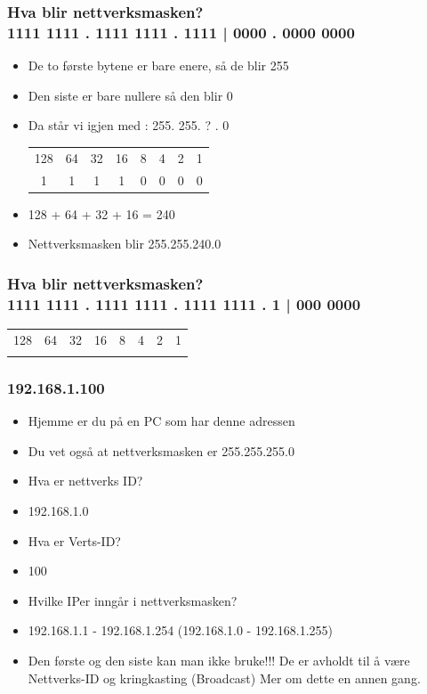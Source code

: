 \documentclass[aspectratio=169,xcolor=dvipsnames]{beamer}
\begin{document}
\begin{frame}
	\frametitle{Hva blir nettverksmasken?\\1111 1111 . 1111 1111 . 1111 | 0000 . 0000 0000 }

			\begin{itemize}
				\item De to første bytene er bare enere, så de blir 255
				\item Den siste er bare nullere så den blir 0
				\item Da står vi igjen med : 255. 255. ? . 0\\
\begin{center}
\begin{tabular}{ c c c c c c c c}
128 & 64 	& 32 	& 16 	& 8  	& 4	& 2	&  1\\
1 & 1 	& 1 	& 1 	& 0  	& 0	& 0	&  0\\
\end{tabular}
\end{center}
				\item 128 + 64 + 32 + 16 = 240
				\item Nettverksmasken blir 255.255.240.0
				

			\end{itemize}
\end{frame}
\begin{frame}
	\frametitle{Hva blir nettverksmasken?\\ 1111 1111 . 1111 1111 . 1111 1111 . 1 | 000 0000 }


\begin{center}
\begin{tabular}{ c c c c c c c c}
128 & 64 	& 32 	& 16 	& 8  	& 4	& 2	&  1\\
 &  	&  	&  	&   	& 	& 	&  \\
\end{tabular}
\end{center}
\end{frame}
\begin{frame}
	\frametitle{192.168.1.100}

			\begin{itemize}
				\item Hjemme er du på en PC som har denne adressen
				\item Du vet også at nettverksmasken er 255.255.255.0
				\item Hva er nettverks ID?
				\item 192.168.1.0
				\item Hva er Verts-ID?
				\item 100
				\item Hvilke IPer inngår i nettverksmasken?
				\item 192.168.1.1 - 192.168.1.254    (192.168.1.0 - 192.168.1.255)
				\item Den første og den siste kan man ikke bruke!!! De er avholdt til å være Nettverks-ID og kringkasting (Broadcast) Mer om dette en annen gang.

			\end{itemize}
\end{frame}
\end{document}
